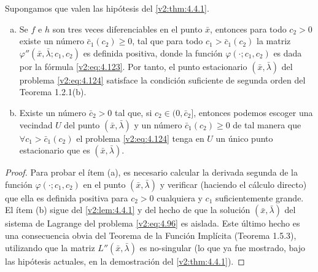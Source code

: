 \begin{theorem}\label{v2:thm:4.4.7}
    Supongamos que valen las hipótesis del \cref{v2:thm:4.4.1}.
    \begin{enumerate}[(a)]
        \item Se $f$ e $h$ son tres veces diferenciables en el punto $\bar{x}$, entonces para todo $c_2 > 0$ existe un número $\bar{c}_1(c_2) \ge 0$, tal que para todo $c_1 > \bar{c}_1(c_2)$ la matriz $\varphi''(\bar{x}, \bar{\lambda}; c_1, c_2)$ es definida positiva, donde la función $\varphi(\cdot; c_1, c_2)$ es dada por la fórmula \eqref{v2:eq:4.123}. Por tanto, el punto estacionario $(\bar{x}, \bar{\lambda})$ del problema \eqref{v2:eq:4.124} satisface la condición suficiente de segunda orden del Teorema 1.2.1(b).
        \item Existe un número $\bar{c}_2 > 0$ tal que, si $c_2 \in (0, \bar{c}_2]$, entonces podemos escoger una vecindad $U$ del punto $(\bar{x}, \bar{\lambda})$ y un número $\bar{c}_1(c_2) \ge 0$ de tal manera que $\forall c_1 > \bar{c}_1(c_2)$ el problema \eqref{v2:eq:4.124} tenga en $U$ un único punto estacionario que es $(\bar{x}, \bar{\lambda})$.
    \end{enumerate}
\end{theorem}
\begin{proof}
    Para probar el ítem (a), es necesario calcular la derivada segunda de la función $\varphi(\cdot; c_1, c_2)$ en el punto $(\bar{x}, \bar{\lambda})$ y verificar (haciendo el cálculo directo) que ella es definida positiva para $c_2 > 0$ cualquiera y $c_1$ suficientemente grande.
    El ítem (b) sigue del \cref{v2:lem:4.4.1} y del hecho de que la solución $(\bar{x}, \bar{\lambda})$ del sistema de Lagrange del problema \eqref{v2:eq:4.96} es aislada. Este último hecho es una consecuencia obvia del Teorema de la Función Implícita (Teorema 1.5.3), utilizando que la matriz $L''(\bar{x}, \bar{\lambda})$ es no-singular (lo que ya fue mostrado, bajo las hipótesis actuales, en la demostración del \cref{v2:thm:4.4.1}).
\end{proof}


